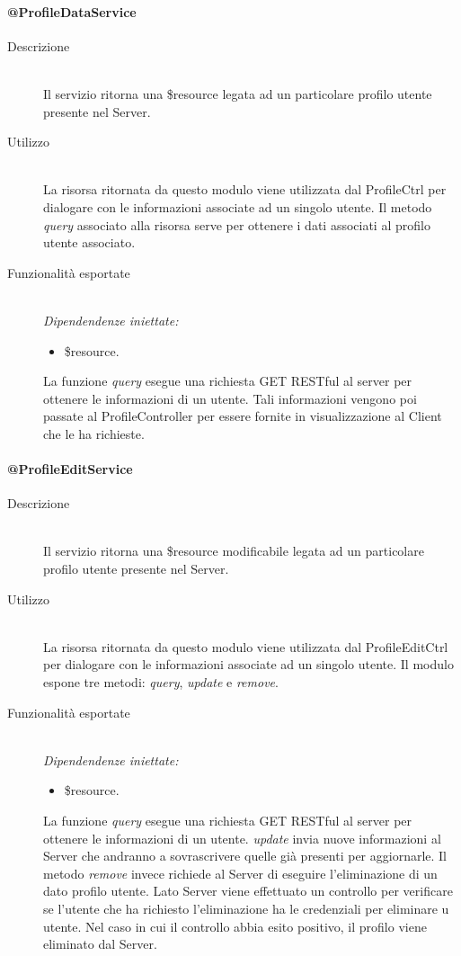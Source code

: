 \paragraph{@ProfileDataService}
\begin{description}
 \item[Descrizione] \hfill \\
 Il servizio ritorna una \$resource legata ad un particolare profilo utente presente nel Server.
 \item[Utilizzo] \hfill \\
 La risorsa ritornata da questo modulo viene utilizzata dal ProfileCtrl per dialogare con le informazioni associate ad un singolo utente.
 Il metodo \textit{query} associato alla risorsa serve per ottenere i dati associati al profilo utente associato.
 \item[Funzionalità esportate] \hfill \\
 \emph{Dipendendenze iniettate:}
 \begin{itemize}
  \item \$resource.
 \end{itemize}
 La funzione \textit{query} esegue una richiesta GET RESTful al server per ottenere le informazioni di un utente. Tali informazioni vengono 
 poi passate al ProfileController per essere fornite in visualizzazione al Client che le ha richieste.
\end{description}

\paragraph{@ProfileEditService}
\begin{description}
 \item[Descrizione] \hfill \\
 Il servizio ritorna una \$resource modificabile legata ad un particolare profilo utente presente nel Server.
 \item[Utilizzo] \hfill \\
 La risorsa ritornata da questo modulo viene utilizzata dal ProfileEditCtrl per dialogare con le informazioni associate ad un singolo utente.
 Il modulo espone tre metodi: \textit{query}, \textit{update} e \textit{remove}.
 \item[Funzionalità esportate] \hfill \\
 \emph{Dipendendenze iniettate:}
 \begin{itemize}
  \item \$resource.
 \end{itemize}
 La funzione \textit{query} esegue una richiesta GET RESTful al server per ottenere le informazioni di un utente. \textit{update} invia 
 nuove informazioni al Server che andranno a sovrascrivere quelle già presenti per aggiornarle. Il metodo \textit{remove} invece richiede al 
 Server di eseguire l'eliminazione di un dato profilo utente. Lato Server viene effettuato un controllo per verificare se l'utente che 
 ha richiesto l'eliminazione ha le credenziali per eliminare u utente. Nel caso in cui il controllo abbia esito positivo, il profilo
 viene eliminato dal Server.
\end{description}


